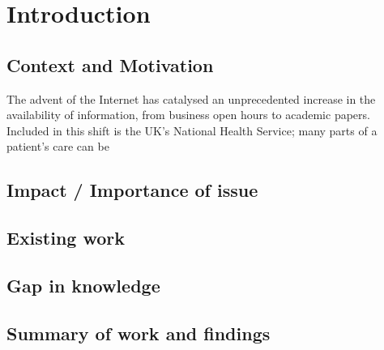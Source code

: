 \chapter{Introduction}\label{cha:intro}

\section{Context and Motivation}
The advent of the Internet has catalysed an unprecedented increase in the availability of information, from business open hours to academic papers. Included in this shift is the UK's National Health Service; many parts of a patient's care can be 

\section{Impact / Importance of issue}

\section{Existing work}

\section{Gap in knowledge}

\section{Summary of work and findings}